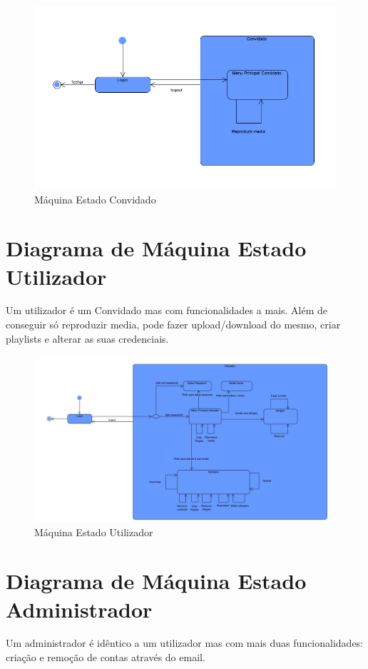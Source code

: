 \documentclass[a4paper]{report}
\begin{document}
\begin{figure}[H]
	\centering 
    \includegraphics[width=\textwidth]{images/maqConvidado.png}  
    \caption{Máquina Estado Convidado}
\end{figure}

\section{Diagrama de Máquina Estado Utilizador}
Um utilizador é um Convidado mas com funcionalidades a mais. Além
de conseguir só reproduzir media, pode fazer upload/download do mesmo, criar
playlists e alterar as suas credenciais.

\begin{figure}[H]
	\centering 
    \includegraphics[width=\textwidth]{images/maqUser.png}  
    \caption{Máquina Estado Utilizador}
\end{figure}

\section{Diagrama de Máquina Estado Administrador}
Um administrador é idêntico a um utilizador mas com mais duas funcionalidades:
criação e remoção de contas através do email.
\end{document}
